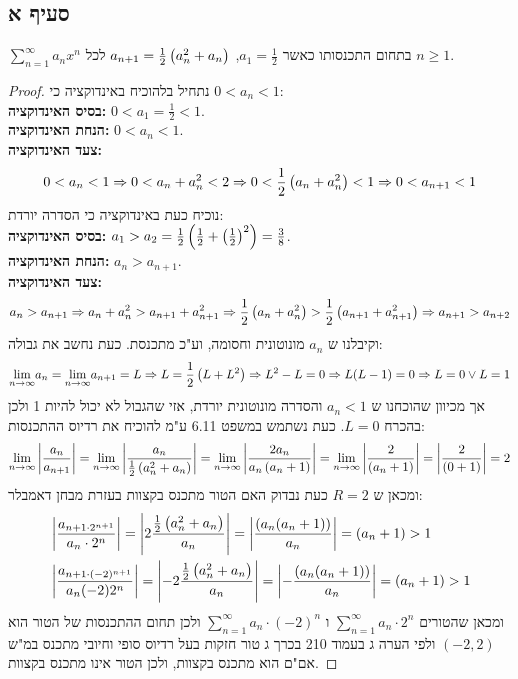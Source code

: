 \documentclass{article}
\begin{document}
	\subsection*{סעיף א}
	$\sum_{n=1}^\infty a_nx^n$
	בתחום התכנסותו כאשר $a_1 = \frac{1}{2}$, $a_{n+1}=\frac{1}{2}\left( a_n^2 + a_n \right)$ לכל $n \geq 1$.
	\begin{proof}
		נתחיל בלהוכיח באינדוקציה כי $0 < a_n < 1$: \\
		\textbf{בסיס האינדוקציה:} $0 < a_1 = \frac{1}{2} < 1$. \\
		\textbf{הנחת האינדוקציה:} $0 < a_n < 1$. \\
		\textbf{צעד האינדוקציה:} \begin{align*}
			0 < a_n < 1
			\Rightarrow 0 < a_n + a_n^2 < 2
			\Rightarrow 0 < \frac{1}{2}\left( a_n + a_n^2 \right) < 1
			\Rightarrow 0 < a_{n+1} < 1
		\end{align*}
		נוכיח כעת באינדוקציה כי הסדרה יורדת: \\
		\textbf{בסיס האינדוקציה:} $a_1 > a_2 = \frac{1}{2} \left( \frac{1}{2} + \left( \frac{1}{2} \right)^2 \right) = \frac{3}{8}$. \\
		\textbf{הנחת האינדוקציה:} $a_n > a_{n+1}$. \\
		\textbf{צעד האינדוקציה:} \begin{align*}
			a_n > a_{n+1}
			\Rightarrow a_n + a_n^2 > a_{n+1} + a_{n+1}^2
			\Rightarrow \frac{1}{2}\left( a_n + a_n^2 \right) > \frac{1}{2}\left( a_{n+1} + a_{n+1}^2 \right)
			\Rightarrow a_{n+1} > a_{n+2}
		\end{align*}
		וקיבלנו ש $a_n$ מונוטונית וחסומה, וע"כ מתכנסת. כעת נחשב את גבולה:
		\begin{align*}
			\displaystyle{\lim_{n \to \infty}} a_n = \displaystyle{\lim_{n \to \infty}} a_{n+1} = L
			\Rightarrow L = \frac{1}{2}\left( L + L^2 \right)
			\Rightarrow L^2 - L = 0
			\Rightarrow L(L - 1) = 0
			\Rightarrow L = 0 \lor L = 1
		\end{align*}
		אך מכיוון שהוכחנו ש $a_n < 1$ והסדרה מונוטונית יורדת, אזי שהגבול לא יכול להיות 1 ולכן בהכרח $L = 0$.
		כעת נשתמש במשפט 6.11 ע"מ להוכיח את רדיוס ההתכנסות:
		\begin{align*}
			\displaystyle{\lim_{n \to \infty}} \left| \frac{a_n}{a_{n+1}} \right|
			= \displaystyle{\lim_{n \to \infty}} \left| \frac{a_n}{\frac{1}{2}\left( a_n^2 + a_n \right)} \right|
			= \displaystyle{\lim_{n \to \infty}} \left| \frac{2a_n}{a_n\left( a_n + 1 \right)} \right|
			= \displaystyle{\lim_{n \to \infty}} \left| \frac{2}{\left( a_n + 1 \right)} \right|
			= \left| \frac{2}{\left( 0 + 1 \right)} \right|
			= 2
		\end{align*}
		ומכאן ש $R=2$ כעת נבדוק האם הטור מתכנס בקצוות בעזרת מבחן דאמבלר:
		\begin{align*}
			&\left| \frac{a_{n+1 \cdot 2^{n+1}}}{a_n \cdot 2^n} \right|
			= \left| 2\frac{\frac{1}{2}\left( a_n^2 + a_n \right)}{a_n} \right|
			= \left| \frac{\left( a_n(a_n + 1) \right)}{a_n} \right|
			= \left( a_n + 1 \right) > 1 \\
			&\left| \frac{a_{n+1 \cdot (-2)^{n+1}}}{a_n (-2) 2^n} \right|
			= \left| -2\frac{\frac{1}{2}\left( a_n^2 + a_n \right)}{a_n} \right|
			= \left| -\frac{\left( a_n(a_n + 1) \right)}{a_n} \right|
			= \left( a_n + 1 \right) > 1
		\end{align*}
		ומכאן שהטורים $\sum_{n=1}^\infty a_n \cdot 2^n$ ו $\sum_{n=1}^\infty a_n \cdot (-2)^n$
		ולכן תחום ההתכנסות של הטור הוא $\boxed{(-2, 2)}$
		ולפי הערה ג בעמוד 210 בכרך ג טור חזקות בעל רדיוס סופי וחיובי מתכנס במ"ש אם"ם הוא מתכנס בקצוות, ולכן הטור אינו מתכנס בקצוות.
	\end{proof}
\end{document}
